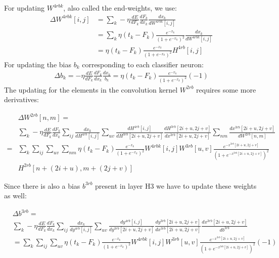 \documentclass[a4paper,onecolumn]{report}
\begin{document}
\\\\
For updating $W^{4rbk}$, also called the end-weights, we use:
\begin{equation}
\begin{split}
\Delta W^{4rbk}[i,j]&= \sum_{k} - \eta \frac{dE}{d F_{k}} \frac{dF_{k}}{dx_{k}} \frac{dx_{k}}{dW^{4rbk}[i,j]} \\
&= \sum_{k} \eta (t_{k}-F_{k})\frac{e^{-x_{k}}}{(1+e^{-x_{k}})^{2}} \frac{dx_{k}}{dW^{4rbk}[i,j]} \\
&= \eta (t_{k}-F_{k})\frac{e^{-x_{k}}}{(1+e^{-x_{k}})^{2}} H^{4rb}[i,j]
\end{split}
\end{equation}
For updating the bias $b_{k}$ corresponding to each classifier neuron:
\begin{equation}
\begin{split}
\Delta b_{k}= - \eta \frac{dE}{d F_{k}} \frac{dF_{k}}{dx_{k}} \frac{dx_{k}}{b_{k}}=\eta (t_{k}-F_{k})\frac{e^{-x_{k}}}{(1+e^{-x_{k}})^{2}} (-1)
\end{split}
\end{equation}
The updating for the elements in the convolution kernel $ W^{2rb}$ requires some more derivatives:
\begin{small}
\begin{equation}
\begin{split}
	&\Delta W^{2rb}[n,m] = \\
	&\sum_{k} - \eta  \frac{dE}{dF_{k}} 
	\frac{dF_{k}}{dx_{k}} 
	\sum_{ij} \frac{dx_{k}}{dH^{4rb}[i,j]} 
	\sum_{uv}\frac{dH^{4rb}[i,j]}{d H^{3rb} [2i+u,2j+v]} 
	\frac{d H^{3rb} [2i+u,2j+v]}{d x^{3rb}[2i+u,2j+v]}
	\sum_{nm}\frac{d x^{3rb}[2i+u,2j+v]}{d W^{2rb}[n,m]} \\
	=&\sum_{k} \sum_{ij} \sum_{uv} \sum_{nm}  \eta (t_{k}-F_{k})\frac{e^{-x_{k}}}{(1+e^{-x_{k}})^{2}} W^{4rbk}[i,j]  W^{3rb}[u,v] \frac{e^{-x^{3rb}[2i+u,2j+v]}}{(1+e^{-x^{3rb}[2i+u,2j+v]})^2} \\
	 & H^{2rb} [n+(2i+u),m+(2j+v)]
\end{split}
\end{equation}
\end{small}
Since there is also a bias $b^{3rb}$ present in layer H3 we have to update these weights as well:
\begin{small}
\begin{equation}
\begin{split}
	&\Delta b^{3rb} =\\
	&\sum_{k} - \eta  \frac{dE}{dF_{k}} 
	\frac{dF_{k}}{dx_{k}} 
	\sum_{ij} \frac{dx_{k}}{dy^{4rb}[i,j]} 
	\sum_{uv}\frac{dy^{4rb}[i,j]}{d y^{3rb} [2i+u,2j+v]} 
	\frac{d y^{3rb} [2i+u,2j+v]}{d x^{3rb}[2i+u,2j+v]}
	\frac{d x^{3rb}[2i+u,2j+v]}{d b^{3rb}} \\
	&=\sum_{k} \sum_{ij} \sum_{uv} \eta (t_{k}-F_{k})\frac{e^{-x_{k}}}{(1+e^{-x_{k}})^{2}} W^{4rbk}[i,j]  W^{3rb}[u,v] \frac{e^{-x^{3rb}[2i+u,2j+v]}}{(1+e^{-x^{3rb}[2i+u,2j+v]})^2} (-1)
\end{split}
\end{equation}
\end{small}
\end{document}

